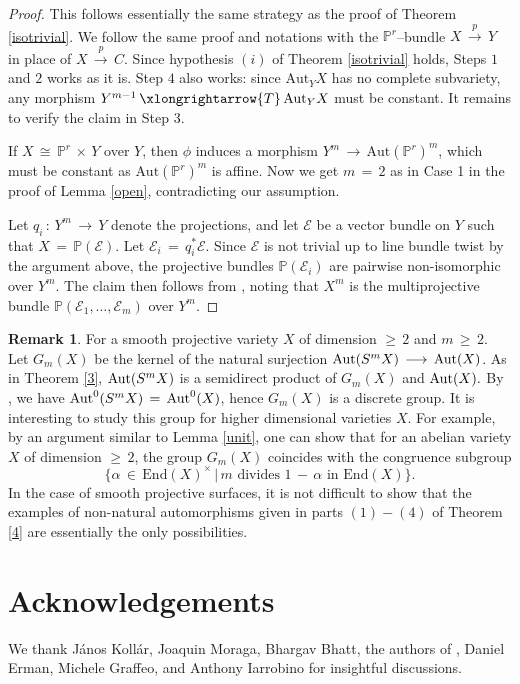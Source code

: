 \documentclass[12pt,reqno]{amsart}
\theoremstyle{definition}
\newtheorem{remark}[lemma]{Remark}
\numberwithin{equation}{section}
\begin{document}
\begin{proof}
This follows essentially the same strategy as the proof of Theorem \ref{isotrivial}. We follow the same proof and notations with the $\mathbb{P}^r$--bundle $X\,\xrightarrow{p}\,Y$ in place of $X\,\xrightarrow{p}\,C$. Since hypothesis $(i)$ of Theorem \ref{isotrivial} holds, Steps $1$ and $2$ works as it is. Step $4$ also works: since $\textrm{Aut}_{Y}X$ has no complete subvariety, any morphism $Y^{m-1}\,\xlongrightarrow{T}\, \textrm{Aut}_{Y}X$ must be constant. It remains to verify the claim in Step $3$.

If $X\,\cong\,\mathbb{P}^r\,\times\, Y $ over $Y$, then $\phi$ induces a morphism $Y^m\,\to \,\text{Aut}(\mathbb{P}^r)^m$, which must be constant as $\text{Aut}(\mathbb{P}^r)^m$ is affine. Now we get $m\,=\,2$ as in Case 1 in the proof of Lemma \ref{open}, contradicting our assumption.

Let $q_i\,:\,Y^m\,\to\, Y$ denote the projections, and let $\mathcal{E}$ be a vector bundle on $Y$ such that $X\,=\,\mathbb{P}(\mathcal{E}).$ Let $\mathcal{E}_i\,=\,q_i^*\mathcal{E}.$ Since $\mathcal{E}$ is not trivial up to line bundle twist by the argument above, the projective bundles $\mathbb{P}(\mathcal{E}_i)$ are pairwise non-isomorphic over $Y^m$. The claim then follows from {\cite[Lemma 2.6]{BSV4}}, noting that $X^m$ is the multiprojective bundle $\mathbb{P}(\mathcal{E}_1,\ldots,\mathcal{E}_m)$ over $Y^m.$
\end{proof}
\begin{remark}
For a smooth projective variety $X$ of dimension $\geq\, 2$ and $m\,\geq\, 2$. Let $G_m(X)$ be the kernel of the natural surjection $\textnormal{Aut} (S^mX)\,\longrightarrow\, \textnormal{Aut}(X)$. As in Theorem \ref{3}, $\textnormal{Aut} (S^mX)$ is a semidirect product of $G_m(X)$ and $\textnormal{Aut} (X).$ By {\cite[Remark 3.1]{BSV3}}, we have $\textnormal{Aut}^{0} (S^mX)\,=\,\textnormal{Aut}^{0} (X)$, hence $G_m(X)$ is a discrete group. It is interesting to study this group for higher dimensional varieties $X.$ For example, by an argument similar to Lemma \ref{unit}, one can show that for an abelian variety $X$ of dimension $\geq\, 2$, the group $G_m(X)$ coincides with the congruence subgroup 
$$\{\alpha \,\in\, \textrm{End}(X)^{\times}\,|\, m \text{ divides } 1\,-\,\alpha \text{ in }\textrm{End}(X)\}. $$ 
In the case of smooth projective surfaces, it is not difficult to show that the examples of non-natural automorphisms given in parts $(1)-(4)$ of Theorem \ref{4} are essentially the only possibilities.
\end{remark}


\section{Acknowledgements}\vskip 3mm We thank János Kollár, Joaquin Moraga, Bhargav Bhatt, the authors of \cite{belmans2020automorphisms}, Daniel Erman, Michele Graffeo, and Anthony Iarrobino for insightful discussions.


\printbibliography
\end{document}
